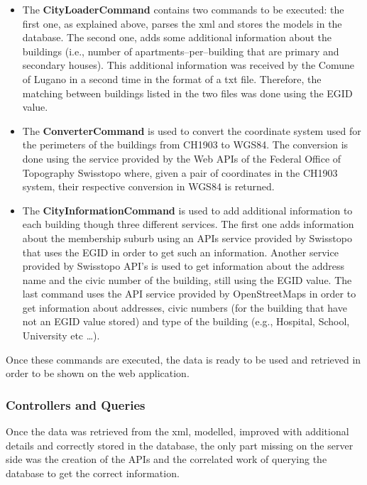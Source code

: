 \begin{itemize}
	\item The {\bf CityLoaderCommand} contains two commands to be executed: the first one, as explained above, parses the xml and stores the models in the database. The second one, adds some additional information about the buildings (i.e., number of apartments--per--building that are primary and secondary houses). This additional information was received by the Comune of Lugano in a second time in the format of a txt file. Therefore, the matching between buildings listed in the two files was done using the EGID value. 
	\item The {\bf ConverterCommand} is used to convert the coordinate system used for the perimeters of the buildings from CH1903 to WGS84. The conversion is done using the service provided by the Web APIs of the Federal Office of Topography Swisstopo  where, given a pair of coordinates in the CH1903 system, their respective conversion in WGS84 is returned.
	\item The {\bf CityInformationCommand} is used to add additional information to each building though three different services. The first one adds information about the membership suburb using an APIs service provided by Swisstopo that uses the EGID in order to get such an information. Another service provided by Swisstopo API's is used to get information about the address name and the civic number of the building, still using the EGID value. The last command uses the API service provided by OpenStreetMaps in order to get information about addresses, civic numbers (for the building that have not an EGID value stored) and type of the building (e.g., Hospital, School, University etc \dots).  
\end{itemize}
Once these commands are executed, the data is ready to be used and retrieved in order to be shown on the web application.
\subsubsection{Controllers and Queries}
Once the data was retrieved from the xml, modelled, improved with additional details and correctly stored in the database, the only part missing on the server side was the creation of the APIs and the correlated work of querying the database to get the correct information.\\


